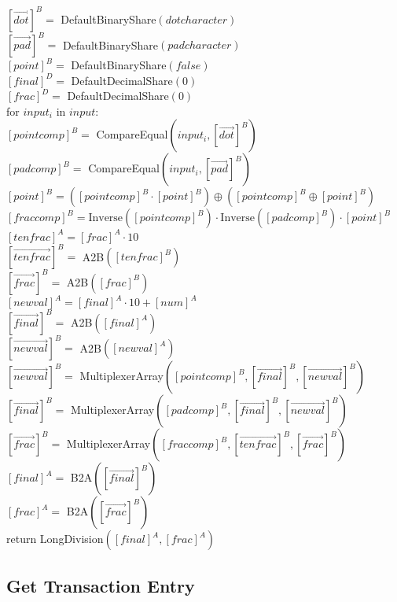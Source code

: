 \begin{protocol}
	${[\vec{dot}]^B} =$ DefaultBinaryShare$(dotcharacter)$\\
	${[\vec{pad}]^B} =$ DefaultBinaryShare$(padcharacter)$\\
	${[point]^B} =$ DefaultBinaryShare$(false)$\\
	${[final]^D} =$ DefaultDecimalShare$(0)$\\
	${[frac]^D} =$ DefaultDecimalShare$(0)$\\
	for $input_i$ in $input$:\\
	\indent ${[pointcomp]^B} =$ CompareEqual$(input_i, [\vec{dot}]^B)$\\
	\indent ${[padcomp]^B} =$ CompareEqual$(input_i, [\vec{pad}]^B)$\\
	\indent ${[point]^B} = ({[pointcomp]^B} \cdot {[point]^B}) \oplus ({[pointcomp]^B} \oplus {[point]^B})$\\
	\indent ${[fraccomp]^B} = \text{Inverse}({[pointcomp]^B}) \cdot \text{Inverse}({[padcomp]^B}) \cdot {[point]^B}$\\
	\indent ${[tenfrac]^A} = {[frac]^A} \cdot 10$\\
        \indent ${[\vec{tenfrac}]^B} = $ A2B$([tenfrac]^B)$\\
        \indent ${[\vec{frac}]^B} = $ A2B$([frac]^B)$\\
	\indent ${[newval]^A} = {[final]^A} \cdot 10 + {[num]^A}$\\
        \indent ${[\vec{final}]^B} = $ A2B$([final]^A)$\\
        \indent ${[\vec{newval}]^B} = $ A2B$([newval]^A)$\\
        \indent ${[\vec{newval}]^B} = $ MultiplexerArray$([pointcomp]^B, {[\vec{final}]^B}, {[\vec{newval}]^B})$\\
        \indent ${[\vec{final}]^B} = $ MultiplexerArray$([padcomp]^B, {[\vec{final}]^B}, {[\vec{newval}]^B})$\\
        \indent ${[\vec{frac}]^B} = $ MultiplexerArray$([fraccomp]^B, {[\vec{tenfrac}]^B}, {[\vec{frac}]^B})$\\
        \indent ${[final]^A} = $ B2A$({[\vec{final}]^B})$\\
        \indent ${[frac]^A} = $ B2A$({[\vec{frac}]^B})$\\
        return LongDivision$({[final]^A}, {[frac]^A})$
\end{protocol}

\subsection{Get Transaction Entry}
\label{sec:get_transaction_entry}

